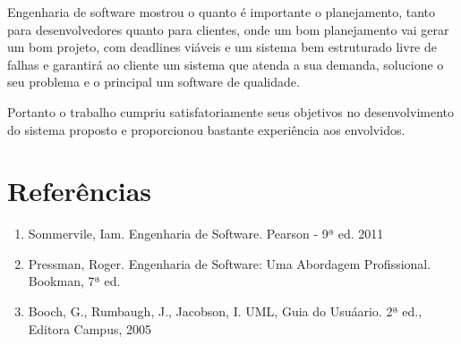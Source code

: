 \documentclass[a4paper,10pt]{article}
\begin{document}
Engenharia de software mostrou o quanto é importante o planejamento, tanto para desenvolvedores quanto para clientes, onde um bom planejamento vai gerar um bom projeto, com deadlines viáveis e um sistema bem estruturado livre de falhas e garantirá ao cliente um sistema que atenda a sua demanda, solucione o seu problema e o principal um software de qualidade.

Portanto o trabalho cumpriu satisfatoriamente seus objetivos no desenvolvimento do sistema proposto e proporcionou bastante experiência aos envolvidos.

\section{Referências}

\begin{enumerate}
\item Sommervile, Iam. Engenharia de Software. Pearson - 9ª ed. 2011
\item Pressman, Roger. Engenharia de Software: Uma Abordagem Profissional. Bookman, 7ª ed.
\item Booch, G., Rumbaugh, J., Jacobson, I. UML, Guia do Usuáario. 2ª ed., Editora Campus, 2005
\end{enumerate}
\end{document}
